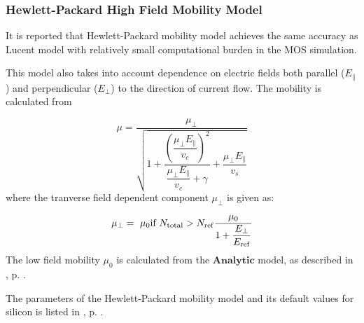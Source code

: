 \documentclass[oneside,12pt]{cgd_book}
\begin{document}
\subsubsection{Hewlett-Packard High Field Mobility Model}
\label{sec:Equation:Mobility:Unified:HP}
It is reported that Hewlett-Packard mobility model
\cite[Cham1986]{} achieves the
          same accuracy as Lucent model with relatively small computational burden in the MOS simulation.
\par
This model also takes into account dependence on electric fields both parallel ($E_\parallel$) and perpendicular ($E_\bot$) to the direction
          of current flow. The mobility is calculated from
\par
\begin{equation}
\mu = \dfrac{\mu _{\bot} } {\sqrt {1 + \dfrac{ \left( \dfrac{\mu_{\bot} E_{\parallel} }{v_{c} }
            \right)^2 } {\dfrac{\mu_{\bot} E_{\parallel} }{v_{c} } + \gamma } + \dfrac{\mu_{\bot} E_{\parallel} } {v_{s}
            } } }
\end{equation}
where the tranverse field dependent component $\mu_{\bot}$ is given
          as:
\par
\begin{equation}
\mu_{\bot} = \  \mu_{0}   \text{if } N_{\rm total} > N_{\rm ref} \\
             \dfrac{\mu_0}{ 1+\dfrac{E_{\bot}}{E_{\rm ref}} }
\end{equation}
The low field mobility $\mu_{0}$ is calculated from the $\mathbf{Analytic}$
model, as described in ,
p. \pageref{sec:Equation:Mobility:Bulk:Analytic}.
\par
The parameters of the Hewlett-Packard mobility model and its default values for silicon is listed in
, p. \pageref{tab:Equation:Mobility:HP:Param}.
\par
\end{document}
